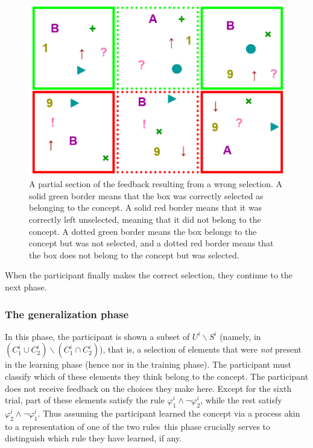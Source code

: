 \begin{figure}[h!] 
\begin{center}
    	\includegraphics[scale=0.5]{papers/images_behavior_research_methods/FeedBack2SeleccionParcial.PNG}
	\caption{A partial section of the feedback resulting from a wrong selection. A solid green border means that the box was correctly selected as belonging to the concept. A solid red border means that it was correctly left unselected, meaning that it did not belong to the concept. A dotted green border means the box belongs to the concept but was not selected, and a dotted red border means that the box does not belong to the concept but was selected.}
	\label{Figure:Misclassifications}
\end{center}
\end{figure}

When the participant finally makes the correct selection, they continue to the next phase. 

\subsubsection{The generalization phase}\label{Subsection:generalization}

In this phase, the participant is shown a subset of $U^i \backslash S^i$ (namely, in $(C^i_1 \cup C^i_2) \backslash (C^i_1 \cap C^i_2)$), that is, a selection of elements that were \emph{not} present in the learning phase (hence nor in the training phase). The participant must classify which of these elements they think belong to the concept. The participant does not receive feedback on the choices they make here. Except for the sixth trial, part of these elements satisfy the rule $\varphi^i_1 \land \lnot \varphi^i_2$, while the rest satisfy $\varphi^i_2 \land \lnot \varphi^i_1$. Thus \textemdash assuming the participant learned the concept via a process akin to a representation of one of the two rules\textemdash\, this phase crucially serves to distinguish which rule they have learned, if any.

